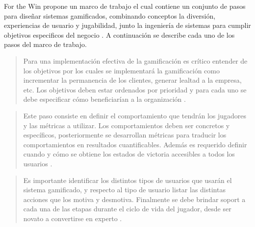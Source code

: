  For the Win propone un marco de trabajo el cual contiene un conjunto de pasos para diseñar sistemas
 gamificados, combinando conceptos la diversión, experiencias de usuario y jugabilidad, junto la
 ingeniería de sistemas para cumplir objetivos especificos del negocio \cite[p. 70]{ForTheWin}.
 A continuación se describe cada uno de los pasos del marco de trabajo.\\
  

    \begin{quote}
        Para una implementación efectiva de la gamificación es crítico entender de los
        objetivos por los cuales se implementará la gamificación como incrementar la
        permanencia de los clientes, generar lealtad a la empresa, etc. Los objetivos
        deben estar ordenados por prioridad y para cada uno se debe especificar cómo
        beneficiarían a la organización \cite[p. 62]{ForTheWin}.
    \end{quote}
    

    
    \begin{quote}
        Este paso consiste en definir el comportamiento que tendrán los jugadores y las
        métricas a utilizar. Los comportamientos deben ser concretos y específicos,
        posteriormente se desarrollan métricas para traducir los comportamientos en
        resultados cuantificables. Además es requerido definir cuando y cómo se obtiene
        los estados de victoria accesibles a todos los usuarios \cite[pp. 63-64]{ForTheWin}.
    \end{quote}
    
  
    
    \begin{quote}
        Es importante identificar los distintos tipos de usuarios que usarán el sistema
        gamificado, y respecto al tipo de usuario listar las distintas acciones que los
        motiva y desmotiva. Finalmente se debe brindar soport a cada una de las etapas durante
        el ciclo de vida del jugador, desde ser novato a convertirse en experto
        \cite[pp. 64-65]{ForTheWin}.
    \end{quote}
    
    

